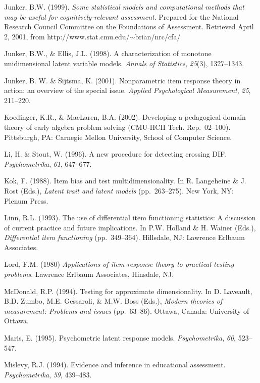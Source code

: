 \documentclass[titlepage,11pt,twoside]{article}
\begin{document}
\begin{thebibliography}
\bibitem Junker, B.W. (1999). \textit{Some statistical models and computational methods that may be useful for cognitively-relevant assessment}. Prepared for the National Research Council Committee on the Foundations of Assessment. Retrieved April 2, 2001, from \mbox{http://www.stat.cmu.edu/$\sim $brian/nrc/cfa/}

\bibitem Junker, B.W., \& Ellis, J.L. (1998). A characterization of monotone unidimensional latent variable models. \textit{Annals of Statistics}, \textit{25}(3), 1327--1343.

\bibitem Junker, B. W. \& Sijtsma, K. (2001). Nonparametric item response theory in action: an overview of the special issue. \textit{Applied Psychological Measurement}, \textit{25}, 211--220.

\bibitem Koedinger, K.R., \& MacLaren, B.A. (2002). Developing a pedagogical domain theory of early algebra problem solving (CMU-HCII Tech. Rep.~02--100). Pittsburgh, PA: Carnegie Mellon University, School of Computer Science.

\bibitem Li, H. \& Stout, W. (1996). A new procedure for detecting crossing DIF. \textit{Psychometrika}, \textit{61}, 647--677.

\bibitem Kok, F. (1988). Item bias and test multidimensionality. In R. Langeheine \& J. Rost (Eds.), \textit{Latent trait and latent models} (pp.~263--275). New York, NY: Plenum Press.

\bibitem Linn, R.L. (1993). The use of differential item functioning statistics: A discussion of current practice and future implications. In P.W. Holland \& H. Wainer (Eds.), \textit{Differential item functioning} (pp.~349--364). Hillsdale, NJ: Lawrence Erlbaum Associates.


\bibitem Lord, F.M. (1980) \textit{Applications of item response theory to practical testing problems}. Lawrence Erlbaum Associates, Hinsdale, NJ.

\bibitem McDonald, R.P. (1994). Testing for approximate dimensionality. In D. Laveault, B.D. Zumbo, M.E. Gessaroli, \& M.W. Boss (Eds.), \textit{Modern theories of measurement: Problems and issues} (pp.~63--86). Ottawa, Canada: University of Ottawa.

\bibitem Maris, E. (1995). Psychometric latent response models. \textit{Psychometrika}, \textit{60}, 523--547.

\bibitem Mislevy, R.J. (1994). Evidence and inference in educational assessment. \textit{Psychometrika}, \textit{59}, 439--483.


\end{thebibliography}
\end{document}
